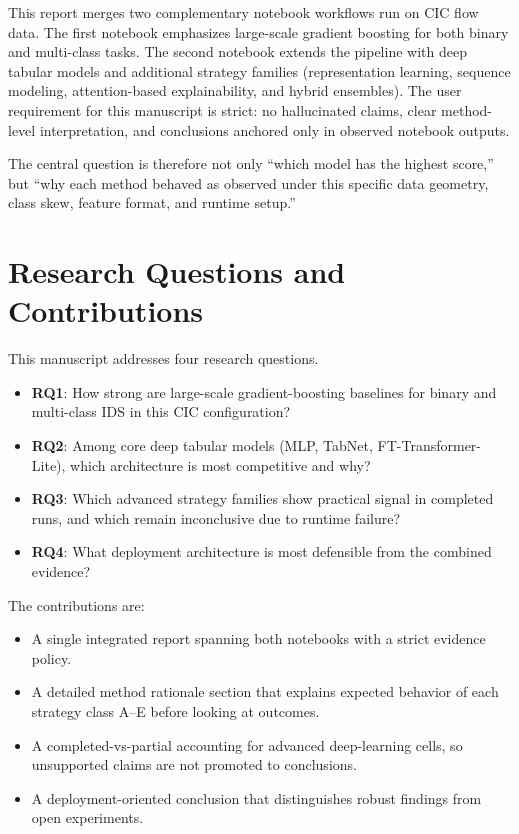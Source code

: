 \documentclass[10pt,journal]{IEEEtran}
\begin{document}
This report merges two complementary notebook workflows run on CIC flow data. The first notebook emphasizes large-scale gradient boosting for both binary and multi-class tasks. The second notebook extends the pipeline with deep tabular models and additional strategy families (representation learning, sequence modeling, attention-based explainability, and hybrid ensembles). The user requirement for this manuscript is strict: no hallucinated claims, clear method-level interpretation, and conclusions anchored only in observed notebook outputs.

The central question is therefore not only ``which model has the highest score,'' but ``why each method behaved as observed under this specific data geometry, class skew, feature format, and runtime setup.''

\section{Research Questions and Contributions}
This manuscript addresses four research questions.

\begin{itemize}
\item \textbf{RQ1}: How strong are large-scale gradient-boosting baselines for binary and multi-class IDS in this CIC configuration?
\item \textbf{RQ2}: Among core deep tabular models (MLP, TabNet, FT-Transformer-Lite), which architecture is most competitive and why?
\item \textbf{RQ3}: Which advanced strategy families show practical signal in completed runs, and which remain inconclusive due to runtime failure?
\item \textbf{RQ4}: What deployment architecture is most defensible from the combined evidence?
\end{itemize}

The contributions are:

\begin{itemize}
\item A single integrated report spanning both notebooks with a strict evidence policy.
\item A detailed method rationale section that explains expected behavior of each strategy class A--E before looking at outcomes.
\item A completed-vs-partial accounting for advanced deep-learning cells, so unsupported claims are not promoted to conclusions.
\item A deployment-oriented conclusion that distinguishes robust findings from open experiments.
\end{itemize}
\end{document}
